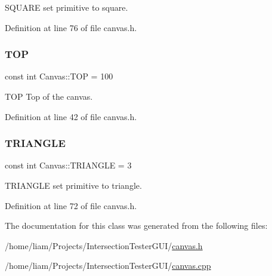 S\+Q\+U\+A\+RE set primitive to square. 



Definition at line 76 of file canvas.\+h.

\mbox{\label{class_canvas_a3d5a1c71903689cf817cd92ae7a2ebc9}} 
\subsubsection{\texorpdfstring{T\+OP}{TOP}}
{\footnotesize\ttfamily const int Canvas\+::\+T\+OP = 100\hspace{0.3cm}{\ttfamily [static]}}



T\+OP Top of the canvas. 



Definition at line 42 of file canvas.\+h.

\mbox{\label{class_canvas_a7d54031701bd0ddbe165a6d4350ab9d6}} 
\subsubsection{\texorpdfstring{T\+R\+I\+A\+N\+G\+LE}{TRIANGLE}}
{\footnotesize\ttfamily const int Canvas\+::\+T\+R\+I\+A\+N\+G\+LE = 3\hspace{0.3cm}{\ttfamily [static]}}



T\+R\+I\+A\+N\+G\+LE set primitive to triangle. 



Definition at line 72 of file canvas.\+h.



The documentation for this class was generated from the following files\+:\begin{DoxyCompactItemize}
\item 
/home/liam/\+Projects/\+Intersection\+Tester\+G\+U\+I/\hyperlink{canvas_8h}{canvas.\+h}\item 
/home/liam/\+Projects/\+Intersection\+Tester\+G\+U\+I/\hyperlink{canvas_8cpp}{canvas.\+cpp}\end{DoxyCompactItemize}
